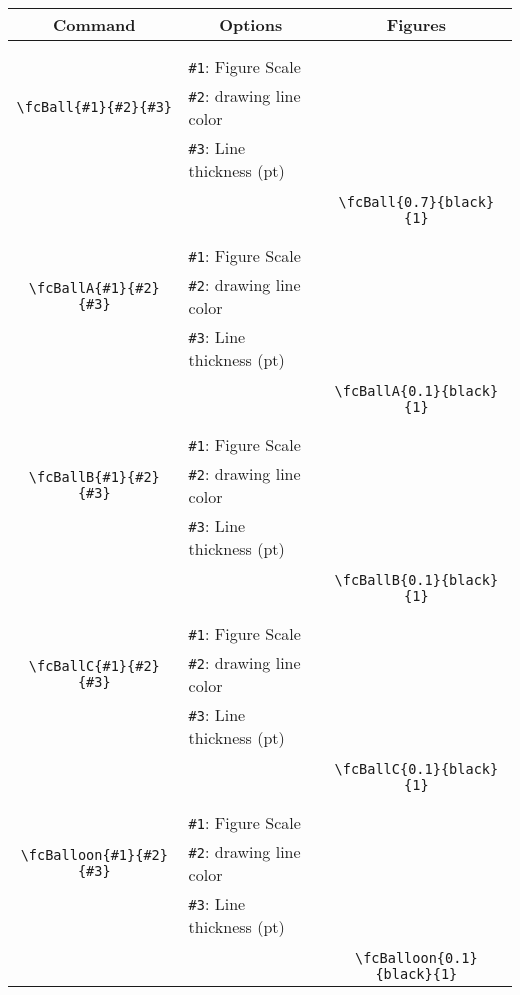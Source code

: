 \documentclass[x11names]{article}
\begin{document}
\begin{table}[H]\centering\begin{tabular}{|c|l|c|}\hline {\bf Command}& \multicolumn{1}{c|}{{\bf Options}} & {\bf Figures}\\  \hline	&&\multirow{5}{*}{\fcBall{0.7}{black}{1}}\\	&&\\	&\verb|#1|: Figure Scale &\\	\verb|\fcBall{#1}{#2}{#3}|&	\verb|#2|: drawing line color &\\	&\verb|#3|: Line thickness (pt) &\\ &&\\&&	\verb|\fcBall{0.7}{black}{1}|\\\hline 	
	&&\multirow{5}{*}{\fcBallA{0.1}{black}{1}}\\	&&\\	&\verb|#1|: Figure Scale &\\	\verb|\fcBallA{#1}{#2}{#3}|&	\verb|#2|: drawing line color &\\	&\verb|#3|: Line thickness (pt) &\\ &&\\&&	\verb|\fcBallA{0.1}{black}{1}|\\\hline 	
	&&\multirow{5}{*}{\fcBallB{0.1}{black}{1}}\\	&&\\	&\verb|#1|: Figure Scale &\\	\verb|\fcBallB{#1}{#2}{#3}|&	\verb|#2|: drawing line color &\\	&\verb|#3|: Line thickness (pt) &\\ &&\\&&	\verb|\fcBallB{0.1}{black}{1}|\\\hline 	
	&&\multirow{5}{*}{\fcBallC{0.1}{black}{1}}\\	&&\\	&\verb|#1|: Figure Scale &\\	\verb|\fcBallC{#1}{#2}{#3}|&	\verb|#2|: drawing line color &\\	&\verb|#3|: Line thickness (pt) &\\ &&\\&&	\verb|\fcBallC{0.1}{black}{1}|\\\hline 	
	&&\multirow{5}{*}{\fcBalloon{0.1}{black}{1}}\\	&&\\	&\verb|#1|: Figure Scale &\\	\verb|\fcBalloon{#1}{#2}{#3}|&	\verb|#2|: drawing line color &\\	&\verb|#3|: Line thickness (pt) &\\ &&\\&&	\verb|\fcBalloon{0.1}{black}{1}|\\\hline 	

\end{tabular}
\end{table}
\end{document}

